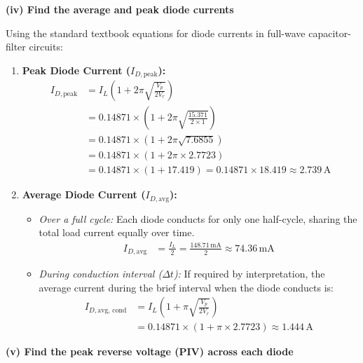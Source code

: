 \documentclass[12pt,a3paper]{article}
\begin{document}
\begin{enumerate}
\begin{tcolorbox}[enhanced,breakable,ansbox,colback=cA!4,colframe=cA,boxrule=0.8pt,arc=5pt,title={\textbf{Answer}},fonttitle=\bfseries\color{white},colbacktitle=cA]
\vspace{0.3cm}

\textbf{(iv) Find the average and peak diode currents}

Using the standard textbook equations for diode currents in full-wave capacitor-filter circuits:
\begin{enumerate}
    \item \textbf{Peak Diode Current ($I_{D,\text{peak}}$):}
    \begin{align}
        I_{D,\text{peak}} &= I_L \left(1 + 2\pi\sqrt{\frac{V_p}{2V_r}}\right) \nonumber \\
        &= 0.14871 \times \left(1 + 2\pi\sqrt{\frac{15.371}{2 \times 1}}\right) \nonumber \\
        &= 0.14871 \times \left(1 + 2\pi\sqrt{7.6855}\right) \nonumber \\
        &= 0.14871 \times \left(1 + 2\pi \times 2.7723\right) \nonumber \\
        &= 0.14871 \times \left(1 + 17.419\right) = 0.14871 \times 18.419 \approx 2.739\,\text{A}
    \end{align}
    
    \item \textbf{Average Diode Current ($I_{D,\text{avg}}$):}
    \begin{itemize}
        \item \textit{Over a full cycle:} Each diode conducts for only one half-cycle, sharing the total load current equally over time.
        \begin{align}
            I_{D,\text{avg}} &= \frac{I_L}{2} = \frac{148.71\,\text{mA}}{2} \approx 74.36\,\text{mA}
        \end{align}
        \item \textit{During conduction interval ($\Delta t$):} If required by interpretation, the average current during the brief interval when the diode conducts is:
        \begin{align}
            I_{D,\text{avg, cond}} &= I_L \left(1 + \pi\sqrt{\frac{V_p}{2V_r}}\right) \nonumber \\
            &= 0.14871 \times \left(1 + \pi \times 2.7723\right) \approx 1.444\,\text{A}
        \end{align}
    \end{itemize}
\end{enumerate}

\vspace{0.3cm}

\textbf{(v) Find the peak reverse voltage (PIV) across each diode}


\end{tcolorbox}
\end{enumerate}
\end{document}

